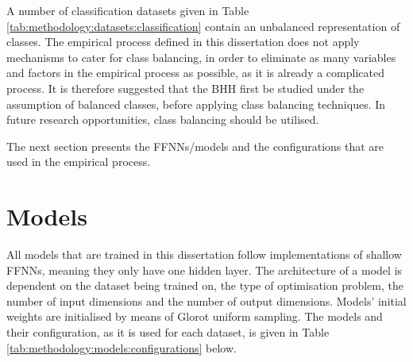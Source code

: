 A number of classification datasets given in Table \ref{tab:methodology:datasets:classification} contain an unbalanced representation of classes. The empirical process defined in this dissertation does not apply mechanisms to cater for class balancing, in order to eliminate as many variables and factors in the empirical process as possible, as it is already a complicated process.  It is therefore suggested that the \ac{BHH} first be studied under the assumption of balanced classes, before applying class balancing techniques. In future research opportunities, class balancing should be utilised.

The next section presents the \acp{FFNN}/models and the configurations that are used in the empirical process.

\section{Models}\label{sec:methodology:model}

All models that are trained in this dissertation follow implementations of shallow \acp{FFNN}, meaning they only have one hidden layer. The architecture of a model is dependent on the dataset being trained on, the type of optimisation problem, the number of input dimensions and the number of output dimensions. Models' initial weights are initialised by means of Glorot uniform sampling. The models and their configuration, as it is used for each dataset, is given in Table \ref{tab:methodology:models:configurations} below.


